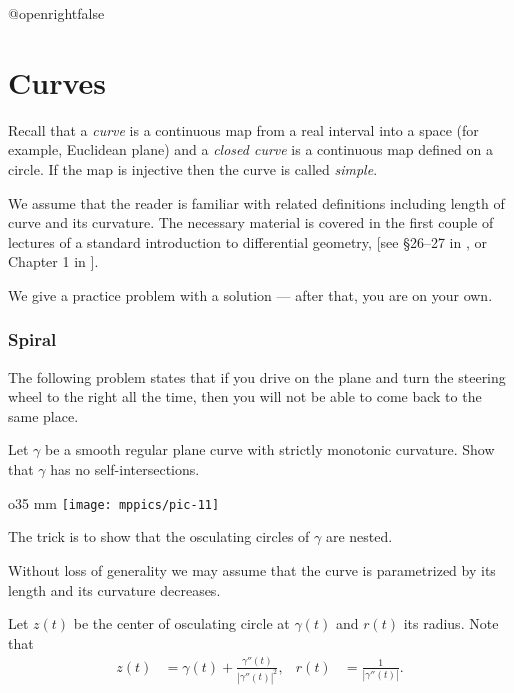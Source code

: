 \csname @openrightfalse\endcsname
\chapter{Curves}

Recall that a \emph{curve} is a continuous map 
from a real interval into a space (for example, Euclidean plane)
and 
a {}\emph{closed curve} is a continuous map defined on a circle.
If the map is injective then the curve is called {}\emph{simple}.

We assume that the reader is familiar with related definitions including 
length of curve 
and its curvature.
The necessary material is covered in the first couple of lectures 
of a standard introduction to differential geometry, [see \S26--27 in , or Chapter 1 in ].

\medskip

We give a practice problem with a solution --- after that, you are on your own.

\subsection*{Spiral}
\label{spiral}

The following problem states that 
if you drive on the plane and turn the steering wheel to the right all the time,
then you will not be able to come back to the same place.

\begin{pr}
Let $\gamma$ be a smooth regular plane curve with strictly monotonic curvature. 
Show that $\gamma$ has no self-intersections.
\end{pr}

\begin{wrapfigure}{o}{35 mm}
\centering
\texttt{[image: mppics/pic-11]}
\end{wrapfigure}

The trick is to show that the osculating circles of $\gamma$ are nested.

\medskip

Without loss of generality we may assume that the curve is parametrized by its length and its
curvature decreases.

Let $z(t)$ be the center of osculating circle at $\gamma(t)$
and $r(t)$ its radius.
Note that 
\begin{align*}
z(t)&=\gamma(t)+\tfrac{\gamma''(t)}{|\gamma''(t)|^2},
&
r(t)&=\tfrac{1}{|\gamma''(t)|}.
\end{align*}

